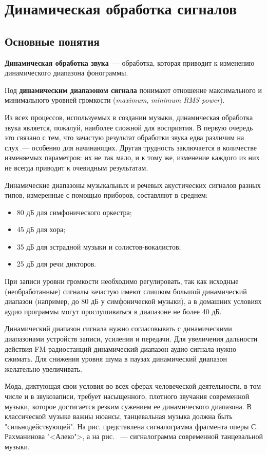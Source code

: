 \documentclass[oneside, final, 14pt]{extreport}
\begin{document}
\setcounter{chapter}{6}
\chapter{Динамическая обработка сигналов}
\tableofcontents

\section{Основные понятия}
\textbf{Динамическая обработка звука}~--- обработка, которая приводит к изменению динамического диапазона фонограммы.

Под \textbf{динамическим диапазоном сигнала} понимают отношение максимального и минимального уровней громкости (\emph{maximum}, \emph{minimum RMS power}).

Из всех процессов, используемых в создании музыки, динамическая обработка звука является, пожалуй, наиболее сложной для восприятия. В первую очередь это связано с тем, что зачастую результат обработки звука едва различим на слух~--- особенно для начинающих. Другая трудность заключается в количестве изменяемых параметров: их не так мало, и к тому же, изменение каждого из них не всегда приводит к очевидным результатам.

Динамические диапазоны музыкальных и речевых акустических сигналов разных типов, измеренные с помощью приборов, составляют в среднем:
\begin{itemize}
  \item 80 дБ для симфонического оркестра;
  \item 45 дБ для хора;
  \item 35 дБ для эстрадной музыки и солистов-вокалистов;
  \item 25 дБ для речи дикторов.
\end{itemize}


При записи уровни громкости необходимо регулировать, так как исходные (необработанные) сигналы зачастую имеют слишком большой динамический диапазон (например, до 80 дБ у симфонической музыки), а в домашних условиях аудио программы могут прослушиваться в диапазоне не более 40 дБ.

Динамический диапазон сигнала нужно согласовывать с динамическими диапазонами устройств записи, усиления и передачи. Для увеличения дальности действия FM-радиостанций динамический диапазон аудио сигнала нужно сжимать. Для снижения уровня шума в паузах динамический диапазон желательно увеличивать.

Мода, диктующая свои условия во всех сферах человеческой деятельности, в том числе и в звукозаписи, требует насыщенного, плотного звучания современной музыки, которое достигается резким сужением ее динамического диапазона.  В классической музыке важны нюансы, танцевальная музыка должна быть "сильнодействующей". На рис. представлена сигналограмма фрагмента оперы С. Рахманинова "<Алеко">, а на рис. ~--- сигналограмма современной танцевальной музыки. 
\end{document}
